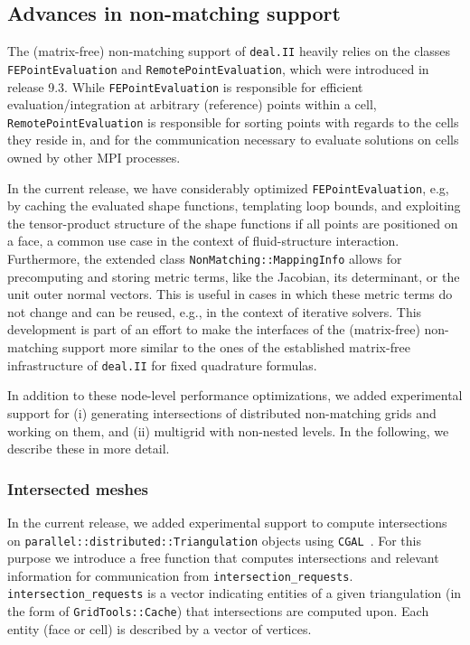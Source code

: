 \documentclass{ansarticle-preprint}
\newcommand{\specialword}[1]{\texttt{#1}}
\newcommand{\dealii}{{\specialword{deal.II}}\xspace}
\begin{document}
\subsection{Advances in non-matching support}\label{sec:nonmatching}

The (matrix-free) non-matching support of \dealii heavily relies
on the classes \texttt{FE\-Point\-Eval\-u\-ation} and \texttt{RemotePointEvaluation},
which were introduced in release 9.3. While \texttt{FE\-Point\-Eval\-u\-a\-tion}
is responsible for efficient evaluation/integration at arbitrary (reference)
points within a cell, \texttt{RemotePointEvaluation} is responsible for
sorting points with regards to the cells they reside in, and for the
communication necessary to evaluate solutions on cells owned by other
MPI processes.

In the current release, we have considerably optimized \texttt{FEPointEvaluation}, e.g,
by caching the evaluated shape functions, templating loop bounds, and
exploiting the tensor-product structure of the shape functions if all points are
positioned on a face, a common use case in the context of fluid-structure
interaction. Furthermore, the extended class \texttt{NonMatching::MappingInfo}
allows for precomputing and storing metric terms, like the Jacobian, its determinant,
or the unit outer normal vectors. This is useful in cases in which these metric terms do not change
and can be reused, e.g., in the context of iterative solvers. This development
is part of an effort to make the interfaces of the 
(matrix-free) non-matching support more similar to the ones of the 
established matrix-free infrastructure of \dealii for fixed quadrature formulas.

In addition to these node-level performance optimizations, we added experimental
support for (i) generating intersections of distributed
non-matching grids and working on them,
and (ii) multigrid with non-nested levels. In the following, we describe these
in more detail.

\subsubsection{Intersected meshes}
In the current release, we added experimental support to compute intersections on \texttt{parallel::distributed::Triangulation} objects using \texttt{CGAL}~\cite{cgal-user-ref}.
For this purpose we introduce a free function that computes intersections and relevant information for communication from \texttt{intersection\_requests}.
\texttt{intersection\_requests} is a vector indicating entities of a given triangulation (in the form of \texttt{GridTools::Cache}) that intersections are computed upon.
Each entity (face or cell) is described by a vector of vertices.
\end{document}
